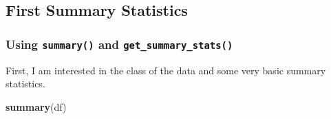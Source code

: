 \documentclass[
  doc]{apa6}
\newenvironment{Shaded}{\begin{snugshade}}{\end{snugshade}}
\newcommand{\FunctionTok}[1]{\textcolor[rgb]{0.13,0.29,0.53}{\textbf{#1}}}
\newcommand{\NormalTok}[1]{#1}
\begin{document}
\hypertarget{first-summary-statistics}{%
\subsection{First Summary Statistics}\label{first-summary-statistics}}

\hypertarget{using-summary-and-get_summary_stats}{%
\subsubsection{\texorpdfstring{Using \texttt{summary()} and \texttt{get\_summary\_stats()}}{Using summary() and get\_summary\_stats()}}\label{using-summary-and-get_summary_stats}}

First, I am interested in the class of the data and some very basic summary statistics.

\begin{Shaded}
\begin{Highlighting}[]
\FunctionTok{summary}\NormalTok{(df)}
\end{Highlighting}
\end{Shaded}
\end{document}
